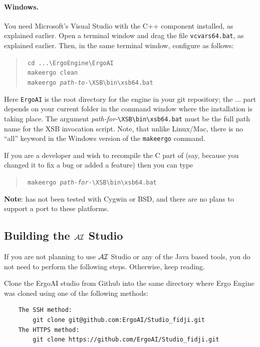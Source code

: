 \documentclass[11pt]{article}
\newcommand{\ERGO}{\mbox{\smaller{\ensuremath{\cal{E}}\smaller{{\sc{RGO}}}}}\xspace}
\newcommand{\ERGOAI}{\mbox{\smaller{\ensuremath{\cal{E}}\smaller{{\sc{RGO}}}}\ensuremath{\cal{AI}}}\xspace}
\newcommand{\FLSYSTEM}{\ERGO}
\newcommand{\bs}{\textbackslash}
\begin{document}
\paragraph{Windows.}
You need Microsoft's Visual Studio with the C++ component installed,
as explained earlier.
Open a terminal window and drag the file
\texttt{vcvars64.bat}, as explained earlier.
Then, in the same terminal window, configure \FLSYSTEM as follows:
\begin{quote}
  \tt
   cd ...\bs{}ErgoEngine\bs{}ErgoAI\\
   \tt
   makeergo clean\\
   \tt
   makeergo \textnormal{\emph{path-to-}}{\bs}XSB{\bs}bin{\bs}xsb64.bat
\end{quote}
Here \texttt{ErgoAI}  is the root directory 
for the \FLSYSTEM engine in your git repository; the ... part depends on
your current folder in the command window where the installation is taking
place. The argument
\textnormal{\emph{path-for-}}\texttt{{\bs}XSB{\bs}bin{\bs}xsb64.bat}
must be the full path name for the XSB invocation script.
Note, that unlike Linux/Mac, there is no ``all'' keyword
in the Windows version of the \texttt{makeergo} command.

If you are a developer and wish to recompile the C part of \FLSYSTEM
(say, because you changed it to fix a bug or added a feature)
then you can type
\begin{quote}
\tt
   makeergo \textnormal{\emph{path-for-}}{\bs}XSB{\bs}bin{\bs}xsb64.bat
\end{quote}

\textbf{Note}: \FLSYSTEM has not been tested with Cygwin or BSD,
and there are no
plans to support a port to these platforms.

\subsection{Building the \ERGOAI Studio}

If you are not planning to use \ERGOAI Studio
or any of the Java based tools, you do not need to perform the following
steps. Otherwise, keep reading.

Clone the ErgoAI studio from Github into the same directory where
Ergo Engine was cloned using one of the following methods:
\begin{verbatim}
    The SSH method:
        git clone git@github.com:ErgoAI/Studio_fidji.git
    The HTTPS method:
        git clone https://github.com/ErgoAI/Studio_fidji.git
\end{verbatim}
\end{document}
